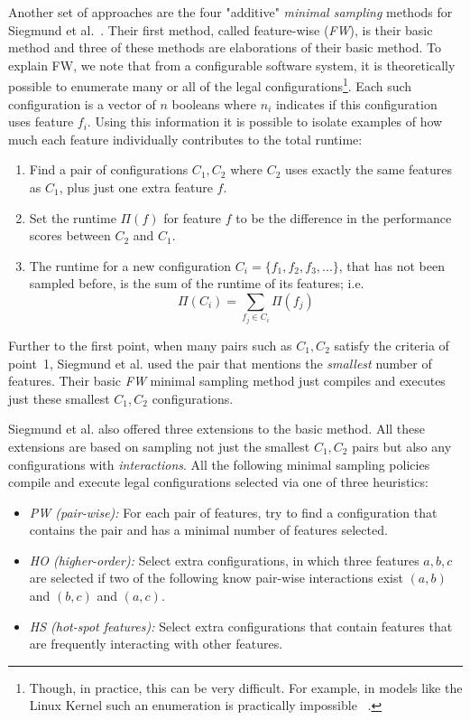 \documentclass{sig-alternative}
\newcommand{\bi}{\begin{itemize}}%
\newcommand{\ei}{\end{itemize}}
\newcommand{\be}{\begin{enumerate}}
\newcommand{\ee}{\end{enumerate}}
\begin{document}
Another set of approaches are the four "additive" {\em minimal sampling} methods for Siegmund et al.~\cite{siegmund2012predicting}.
Their first method, called feature-wise ({\em FW}), is their basic method and 
three of these methods are    elaborations of their basic method.
To explain FW, we note that from a configurable software system, it is theoretically possible to enumerate many or all of the legal configurations\footnote{Though, in practice, this can be very difficult. For example, in models like the Linux Kernel such an enumeration is practically impossible ~\cite{sayyad13b}.}. 
Each such
configuration is a vector of $n$ booleans where $n_i$ indicates if this configuration uses feature $f_i$.
Using this information it  is possible to isolate examples of how much each feature individually contributes to the total runtime:
\be
\item Find a pair of  configurations $C_1,C_2$  where $C_2$ uses exactly the same features as $C_1$, plus just one  extra feature $f$.
\item Set the runtime $\Pi(f)$ for feature $f$ to be the difference in the performance scores between $C_2$ and $C_1$.
\item The runtime  for a new configuration  $C_i=\{f_1,f_2,f_3, ...\}$, that has not been sampled before,  is the sum of the runtime of its features; i.e.
\begin{equation}
  \Pi(C_i) = \sum_{f_j \in C_i}\Pi(f_j)  
\end{equation}
\ee

Further to the first point, when many pairs such as ${C_1,C_2}$ satisfy the criteria of point~1, Siegmund et al. used the 
pair that mentions the {\em smallest} number of features. Their basic {\em FW} minimal sampling method 
just compiles and executes just these smallest $C_1,C_2$ configurations. 

Siegmund et al. also offered three extensions to the basic method. All these extensions are based on sampling
not just the smallest $C_1,C_2$  pairs but also any configurations with {\em interactions}. 
All the following minimal sampling policies compile and   execute legal configurations selected via one of three heuristics:
\bi
\item[{\em PW (pair-wise):}] For each pair of features, try to find a configuration that contains the pair and has a minimal number of features selected. 
\item[{\em HO (higher-order):}] Select extra configurations, in which three features $a,b,c$ are selected if two of the following know pair-wise interactions exist $(a,b)$ and $(b,c)$ and $(a,c)$.
\item[{\em HS (hot-spot features):}] Select extra configurations that contain features that are
frequently interacting with other features. 
\ei
\end{document}
